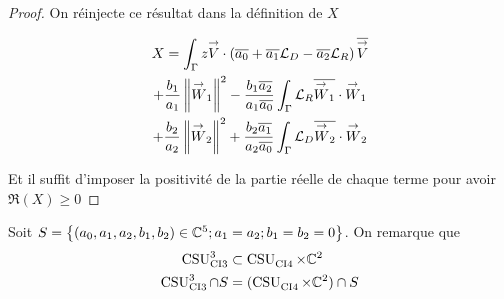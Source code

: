\begin{proof}
    On réinjecte ce résultat dans la définition de \(X\)

    \begin{multline*}
      X = \int_\Gamma z \vV \cdot \left(\conj{a_0}  + \conj{a_1} \LD - \conj{a_2}\LR\right)\conj{\vV}
      \\
      + \frac{b_1}{a_1} \norm{\vW_1}^2 - \frac{b_1\conj{a_2}}{a_1\conj{a_0}}\int_\Gamma \LR\conj{\vW_1}\cdot\vW_1
      \\
      + \frac{b_2}{a_2} \norm{\vW_2}^2 + \frac{b_2\conj{a_1}}{a_2\conj{a_0}}\int_\Gamma \LD\conj{\vW_2}\cdot\vW_2
    \end{multline*}

    Et il suffit d'imposer la positivité de la partie réelle de chaque terme pour avoir \(\Re(X)\ge 0\)
  \end{proof}

  Soit \(S = \left\lbrace (a_0,a_1,a_2,b_1,b_2) \in \CC^5 ; a_1 = a_2 ; b_1 = b_2 = 0 \right\rbrace \). On remarque que
  \begin{align}
    \CSU[3]{CI3} & \subset \CSU{CI4}\times\CC^2
    \\ 
    \CSU[3]{CI3}\cap S & = (\CSU{CI4}\times\CC^2)\cap S 
  \end{align}
